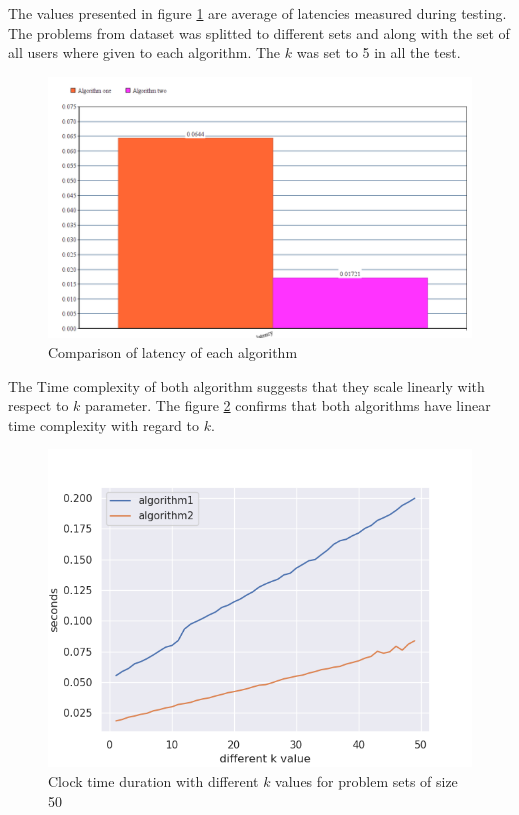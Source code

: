 \documentclass{template}
\begin{document}
The values presented in figure \ref{fig:latency_eval} are average of latencies measured during testing.
The problems from dataset was splitted to different sets and along with the set of all users where 
given to each algorithm. The \(k\) was set to 5 in all the test.

\begin{figure}
    \includegraphics[width=\linewidth]{./images/latency_eval.png}
    \caption{Comparison of latency of each algorithm}
    \label{fig:latency_eval}
\end{figure}

The Time complexity of both algorithm suggests that they scale linearly with respect to \(k\) parameter.
The figure \ref{fig:k-comparison} confirms that both algorithms have linear time complexity with regard
to \(k\).

\begin{figure}
    \includegraphics[width=\linewidth]{./images/algo1_algo2_diff_k_sns.png}
    \caption{Clock time duration with different \(k\) values for problem sets of size 50}
    \label{fig:k-comparison}
\end{figure} 
\end{document}
